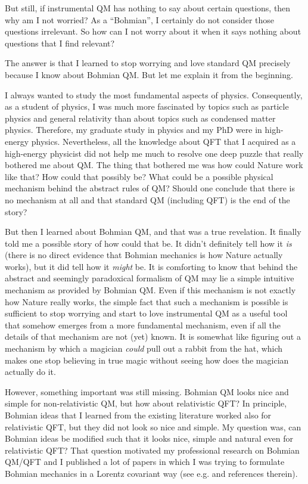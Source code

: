 \documentclass[12pt]{article}
\begin{document}
But still, if instrumental QM has nothing to say about certain questions, then why am I not worried? 
As a ``Bohmian'', I certainly do not consider those questions irrelevant. So how can I not worry about 
it when it says nothing about questions that I find relevant?

The answer is that I learned to stop worrying and love standard QM precisely because I know about Bohmian QM. 
But let me explain it from the beginning.

I always wanted to study the most fundamental aspects of physics. Consequently, as a student of physics, 
I was much more fascinated by topics such as particle physics and general relativity than about topics such 
as condensed matter physics. Therefore, my graduate study in physics and my PhD were in high-energy physics. 
Nevertheless, all the knowledge about QFT that I acquired as a high-energy physicist 
did not help me much to resolve one deep puzzle that really bothered me about QM. 
The thing that bothered me was how could Nature work like that? How could that possibly be? What could be a possible physical 
mechanism behind the abstract rules of QM? Should one conclude that there is no mechanism at all and that standard QM 
(including QFT) is the end of the story?

But then I learned about Bohmian QM, and that was a true revelation. It finally told me a possible story of how could that be. 
It didn't definitely tell how it {\em is} (there is no direct evidence that Bohmian mechanics is how Nature actually works), 
but it did tell how it {\em might} be. It is comforting to know that behind the abstract and seemingly paradoxical formalism of QM 
may lie a simple intuitive mechanism as provided by Bohmian QM. Even if this mechanism is not exactly how Nature really works, 
the simple fact that such a mechanism is possible is sufficient to stop worrying and start to love instrumental QM as a useful 
tool that somehow emerges from a more fundamental mechanism, even if all the details of that mechanism are not (yet) known.
It is somewhat like figuring out a mechanism by which a magician {\em could} pull out a rabbit from the hat,  
which makes one stop believing in true magic
without seeing how does the magician actually do it.

However, something important was still missing. Bohmian QM looks nice and simple for non-relativistic QM, 
but how about relativistic QFT? In principle, Bohmian ideas that I learned from the existing literature
worked also for relativistic QFT, 
but they did not look so nice and simple. My question was, can Bohmian ideas be modified such that it looks nice, 
simple and natural even for relativistic QFT? That question motivated my professional research on Bohmian QM/QFT 
and I published a lot of papers in which I was trying to formulate Bohmian mechanics in a Lorentz covariant
way (see e.g. \cite{nik-pilotQFT,nik-book} and references therein).
\end{document}
